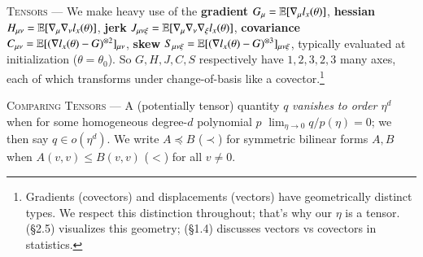 
            \textsc{Tensors} --- We make heavy use of the %
            \textbf{gradient} $G_\mu = \mathbb{E}[\nabla_\mu l_x(\theta)]$, %
            \textbf{hessian} $H_{\mu\nu} = \mathbb{E}[\nabla_\mu\nabla_\nu l_x(\theta)]$, %
            \textbf{jerk} \squish $J_{\mu\nu\xi} = \mathbb{E}[\nabla_\mu\nabla_\nu\nabla_\xi l_x(\theta)]$, %
            \textbf{covariance} $C_{\mu\nu} = \mathbb{E}[(\nabla l_x(\theta) - G)^{\otimes 2}]_{\mu\nu}$, %
            \textbf{skew} \squash $S_{\mu\nu\xi} = \mathbb{E}[(\nabla l_x(\theta) - G)^{\otimes 3}]_{\mu\nu\xi}$, %
            \squash typically evaluated at
            initialization ($\theta=\theta_0$).
            So $G, H, J, C, S$ respectively have $1, 2, 3, 2, 3$ many axes, each of which
            transforms under change-of-basis like a covector.\footnote{
                Gradients
                (covectors) and displacements (vectors) have geometrically
                distinct types.  We respect this distinction throughout; that's
                why our $\eta$ is a tensor.
                \cite{mi73} (\S2.5) visualizes this geometry;
                \cite{cu87} (\S1.4) discusses vectors vs covectors in statistics.
            }

            \textsc{Comparing Tensors} --- A (potentially tensor)
            quantity $q$ \emph{vanishes to order $\eta^d$} when
            for some homogeneous degree-$d$ polynomial $p$
            $\lim_{\eta\to 0} q/p(\eta) = 0$; we then say $q\in o(\eta^d)$.
            We write $A \preceq B$ ($\prec$) for symmetric bilinear forms $A,
            B$ when $A(v,v) \leq B(v,v)$ ($<$) for all $v\neq 0$. 

